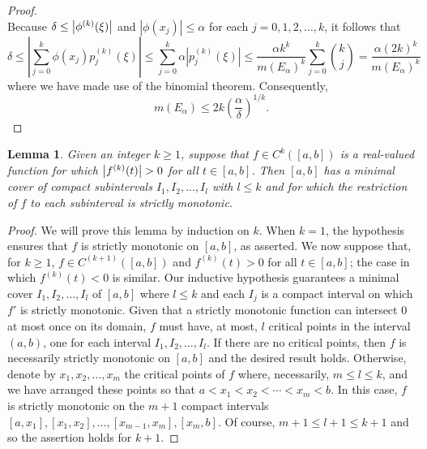 \documentclass[11pt, letter]{book}
\newtheorem{lemma}[theorem]{Lemma}
\begin{document}
\begin{proof}
\begin{equation*}
\end{equation*}
Because $\delta\leq \abs{\phi^{(k)}(\xi)}$ and $|\phi(x_j)|\leq \alpha$ for each $j=0,1,2,\dots,k$, it follows that
\begin{equation*}
\delta\leq \left|\sum_{j=0}^k \phi(x_j)p_j^{(k)}(\xi)\right|\leq \sum_{j=0}^k\alpha|p_j^{(k)}(\xi)|\leq \frac{\alpha k^k}{m(E_\alpha)^k}\sum_{j=0}^k{k\choose j}=\frac{\alpha (2k)^k}{m(E_\alpha)^k}
\end{equation*}
where we have made use of the binomial theorem. Consequently,
\begin{equation*}
    m(E_\alpha)\leq 2k\left(\frac{\alpha}{\delta}\right)^{1/k}.
\end{equation*}
\end{proof}

\begin{framed}
\begin{lemma}\label{lem:CriticalPoints} Given an integer $k \geq 1$, suppose that $f \in C^k([a,b])$ is a real-valued function for which $\abs{f^{(k)}(t)} > 0$ for all $t\in [a,b]$. Then $[a,b]$ has a minimal cover of compact subintervals $I_1,I_2,\dots,I_l$ with $l\leq k$ and for which the restriction of $f$ to each subinterval is strictly monotonic.
\end{lemma}
\end{framed}

\begin{proof}
We will prove this lemma by induction on $k$. When $k=1$, the hypothesis ensures that $f$ is strictly monotonic on $[a,b]$, as asserted. We now suppose that, for $k\geq 1$, $f\in C^{(k+1)}([a,b])$ and $f^{(k)}(t)>0$ for all $t\in [a,b]$; the case in which $f^{(k)}(t)<0$ is similar. Our inductive hypothesis guarantees a minimal cover $I_1,I_2,\dots,I_l$ of $[a,b]$ where $l\leq k$ and each $I_j$ is a compact interval on which $f'$ is strictly monotonic. Given that a strictly monotonic function can intersect $0$ at most once on its domain, $f$ must have, at most, $l$ critical points in the interval $(a,b)$, one for each interval $I_1,I_2,\dots,I_l$. If there are no critical points, then $f$ is necessarily strictly monotonic on $[a,b]$ and the desired result holds. Otherwise, denote by $x_1,x_2,\dots,x_m$ the critical points of $f$ where, necessarily, $m\leq l\leq k$, and we have arranged these points so that $a<x_1<x_2<\cdots<x_m<b$. In this case, $f$ is strictly monotonic on the $m+1$ compact intervals $[a,x_1],[x_1,x_2],\dots,[x_{m-1},x_m],[x_m,b]$. Of course, $m+1\leq l+1\leq k+1$ and so the assertion holds for $k+1$.
\end{proof}
\end{document}

